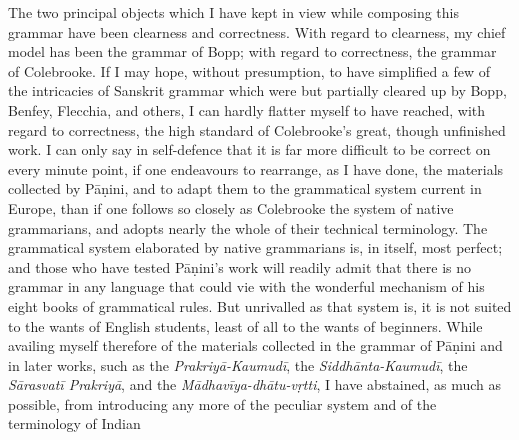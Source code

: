 The two principal objects which I have kept in view while composing this
grammar have been clearness and correctness. With regard to clearness,
my chief model has been the grammar of Bopp; with regard to correctness,
the grammar of Colebrooke. If I may hope, without presumption, to have
simplified a few of the intricacies of Sanskrit grammar which were but
partially cleared up by Bopp, Benfey, Flecchia, and others, I can hardly
flatter myself to have reached, with regard to correctness, the high
standard of Colebrooke's great, though unfinished work. I can only say
in self-defence that it is far more difficult to be correct on every
minute point, if one endeavours to rearrange, as I have done, the
materials collected by Pāṇini, and to adapt them to the grammatical
system current in Europe, than if one follows so closely as Colebrooke
the system of native grammarians, and adopts nearly the whole of their
technical terminology. The grammatical system elaborated by native
grammarians is, in itself, most perfect; and those who have tested
Pāṇini's work will readily admit that there is no grammar in any
language that could vie with the wonderful mechanism of his eight books
of grammatical rules. But unrivalled as that system is, it is not suited
to the wants of English students, least of all to the wants of
beginners. While availing myself therefore of the materials collected in
the grammar of Pāṇini and in later works, such as the
\emph{Prakriyā-Kaumudī}, the \emph{Siddhānta-Kaumudī}, the
\emph{Sārasvatī Prakriyā}, and the \emph{Mādhavīya-dhātu-vṛtti}, I have
abstained, as much as possible, from introducing any more of the
peculiar system and of the terminology of Indian
